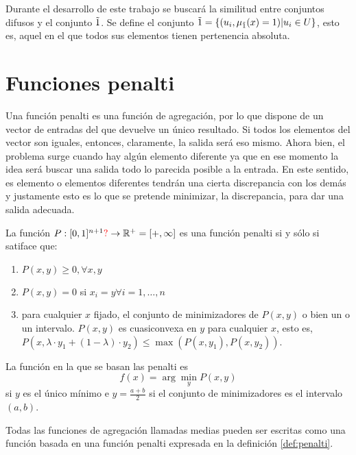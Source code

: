 Durante el desarrollo de este trabajo se buscará la similitud entre conjuntos difusos y el conjunto $\tilda1$. Se define el conjunto $\tilda1 =\{(u_{i}, \mu_{\tilda1}(x)=1)|u_{i}\in U \}$, esto es, aquel en el que todos sus elementos tienen pertenencia absoluta.



\section{Funciones penalti}\label{sec:penalti}
Una función penalti  \cite{art:calvo} es una función de agregación, por lo que dispone de un vector de entradas del que devuelve un único resultado. Si todos los elementos del vector son iguales, entonces, claramente, la salida será eso mismo. Ahora bien, el problema surge cuando hay algún elemento diferente ya que en ese momento la idea será buscar una salida todo lo parecida posible a la entrada. En este sentido, es elemento o elementos diferentes tendrán una cierta discrepancia con los demás y justamente esto es lo que se pretende minimizar, la discrepancia, para dar una salida adecuada. 

\begin{definition}\label{def:penalti}
La función $P:[0,1]^{n+1}{\color{red}\Large?}\rightarrow \mathbb{R}^{+} = [+, \infty]$ es una función penalti si y sólo si satiface que:
\begin{enumerate}
	\item $P(x, y) \geq 0, \forall x, y$
	\item $P(x, y) = 0$ si $x_{i}=y \forall i=1,\dots ,n$
	\item para cualquier $x$ fijado, el conjunto de minimizadores de $P(x, y)$ o bien un  o un intervalo.  $P(x,y)$ es cuasiconvexa en $y$ para cualquier $x$, esto es, $P(x, \lambda\cdot y_{1} +(1-\lambda)\cdot y_{2})\leq \max(P(x, y_{1}), P(x, y_{2}))$.
\end{enumerate}
\end{definition}
La función en la que se basan las penalti es $$f(x)=\arg\min_{y} P(x,y)$$ si $y$ es el único mínimo e $y=\frac{a+b}{2}$ si el conjunto de minimizadores es el intervalo $(a, b)$.

\begin{theorem}
Todas las funciones de agregación llamadas medias pueden ser escritas como una función basada en una función penalti expresada en la definición \ref{def:penalti}.
\end{theorem}


